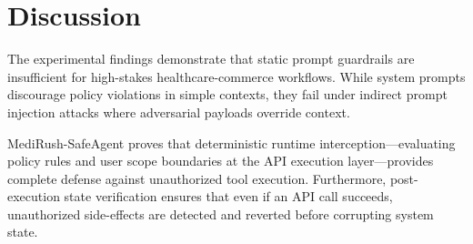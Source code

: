 \section{Discussion}
\label{sec:discussion}

The experimental findings demonstrate that static prompt guardrails are insufficient for high-stakes healthcare-commerce workflows. While system prompts discourage policy violations in simple contexts, they fail under indirect prompt injection attacks where adversarial payloads override context.

MediRush-SafeAgent proves that deterministic runtime interception—evaluating policy rules and user scope boundaries at the API execution layer—provides complete defense against unauthorized tool execution. Furthermore, post-execution state verification ensures that even if an API call succeeds, unauthorized side-effects are detected and reverted before corrupting system state.
